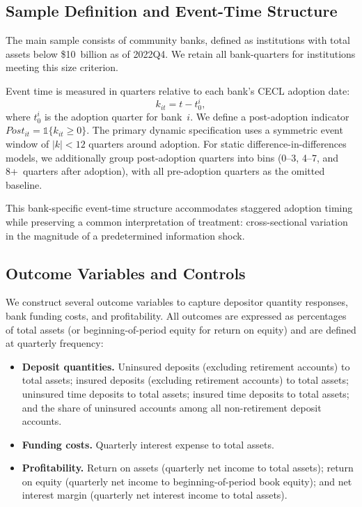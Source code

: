 \subsection{Sample Definition and Event-Time Structure}

The main sample consists of community banks, defined as institutions with total assets below \$10~billion as of 2022Q4. We retain all bank-quarters for institutions meeting this size criterion.

Event time is measured in quarters relative to each bank's CECL adoption date:
\[
k_{it} = t - t_0^i,
\]
where $t_0^i$ is the adoption quarter for bank~$i$. We define a post-adoption indicator $Post_{it} = \mathbb{1}\{k_{it} \geq 0\}$. The primary dynamic specification uses a symmetric event window of $|k| < 12$ quarters around adoption. For static difference-in-differences models, we additionally group post-adoption quarters into bins (0--3, 4--7, and 8+~quarters after adoption), with all pre-adoption quarters as the omitted baseline.

This bank-specific event-time structure accommodates staggered adoption timing while preserving a common interpretation of treatment: cross-sectional variation in the magnitude of a predetermined information shock.

\subsection{Outcome Variables and Controls}

We construct several outcome variables to capture depositor quantity responses, bank funding costs, and profitability. All outcomes are expressed as percentages of total assets (or beginning-of-period equity for return on equity) and are defined at quarterly frequency:

\begin{itemize}
\item \textbf{Deposit quantities.} Uninsured deposits (excluding retirement accounts) to total assets; insured deposits (excluding retirement accounts) to total assets; uninsured time deposits to total assets; insured time deposits to total assets; and the share of uninsured accounts among all non-retirement deposit accounts.
\item \textbf{Funding costs.} Quarterly interest expense to total assets.
\item \textbf{Profitability.} Return on assets (quarterly net income to total assets); return on equity (quarterly net income to beginning-of-period book equity); and net interest margin (quarterly net interest income to total assets).
\end{itemize}

